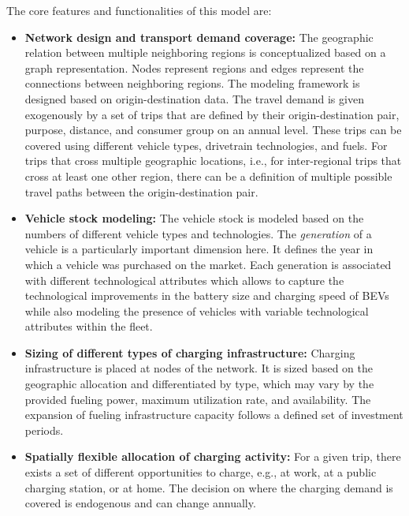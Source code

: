     The core features and functionalities of this model are:

    \begin{itemize}
        \item \textbf{Network design and transport demand coverage:} The geographic relation between multiple neighboring regions is conceptualized based on a graph representation. Nodes represent regions and edges represent the connections between neighboring regions. The modeling framework is designed based on origin-destination data. The travel demand is given exogenously by a set of trips that are defined by their origin-destination pair, purpose, distance, and consumer group on an annual level. These trips can be covered using different vehicle types, drivetrain technologies, and fuels. For trips that cross multiple geographic locations, i.e., for inter-regional trips that cross at least one other region, there can be a definition of multiple possible travel paths between the origin-destination pair.

        \item \textbf{Vehicle stock modeling:} The vehicle stock is modeled based on the numbers of different vehicle types and technologies. The \textit{generation} of a vehicle is a particularly important dimension here. It defines the year in which a vehicle was purchased on the market. Each generation is associated with different technological attributes which allows to capture the technological improvements in the battery size and charging speed of \acp{BEV} while also modeling the presence of vehicles with variable technological attributes within the fleet.

        \item \textbf{Sizing of different types of charging infrastructure:} Charging infrastructure is placed at nodes of the network. It is sized based on the geographic allocation and differentiated by type, which may vary by the provided fueling power, maximum utilization rate, and availability. The expansion of fueling infrastructure capacity follows a defined set of investment periods.

        \item \textbf{Spatially flexible allocation of charging activity:} For a given trip, there exists a set of different opportunities to charge, e.g., at work, at a public charging station, or at home. The decision on where the charging demand is covered is endogenous and can change annually.
    \end{itemize}

